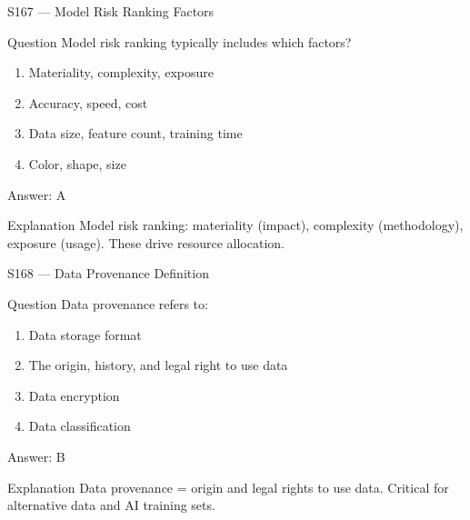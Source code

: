 \documentclass[aspectratio=169,8pt]{beamer}
\begin{document}
	\begin{frame}{S167 --- Model Risk Ranking Factors}
		\begin{block}{Question}
			Model risk ranking typically includes which factors?
			\begin{enumerate}
				\item Materiality, complexity, exposure
				\item Accuracy, speed, cost
				\item Data size, feature count, training time
				\item Color, shape, size
			\end{enumerate}
		\end{block}
		\begin{exampleblock}{Answer: A}\end{exampleblock}
		\begin{block}{Explanation}
			Model risk ranking: materiality (impact), complexity (methodology), exposure (usage). These drive resource allocation.
		\end{block}
	\end{frame}
	
	\begin{frame}{S168 --- Data Provenance Definition}
		\begin{block}{Question}
			Data provenance refers to:
			\begin{enumerate}
				\item Data storage format
				\item The origin, history, and legal right to use data
				\item Data encryption
				\item Data classification
			\end{enumerate}
		\end{block}
		\begin{exampleblock}{Answer: B}\end{exampleblock}
		\begin{block}{Explanation}
			Data provenance = origin and legal rights to use data. Critical for alternative data and AI training sets.
		\end{block}
	\end{frame}
	
\end{document}
